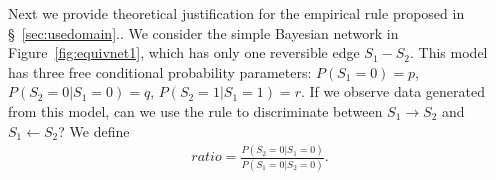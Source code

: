 \documentclass{edm_template}
\begin{document}
Next we provide theoretical justification for the empirical rule proposed in \S~\ref{sec:usedomain}..
%
We consider the simple Bayesian network in Figure~\ref{fig:equivnet1}, which has only one reversible edge $S_1-S_2$.
This model has three free conditional probability parameters: $P(S_1=0)=p$, $P(S_2=0|S_1=0)=q$, $P(S_2=1|S_1=1)=r$.
If we observe data generated from this model, 
can we use the rule to discriminate between $S_1\rightarrow S_2$ and $S_1\leftarrow S_2$? %
We define
\begin{align}
ratio=\frac{P(S_2=0|S_1=0)}{P(S_1=0|S_2=0)}.
\end{align}
\end{document}
